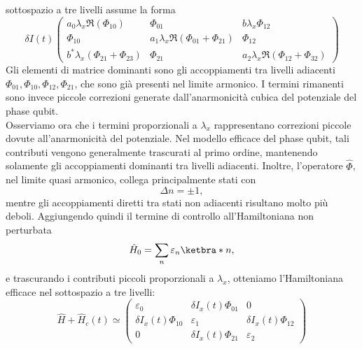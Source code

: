 sottospazio a tre livelli assume la forma
\begin{equation*}
    \delta I(t)
    \begin{pmatrix}
        a_0 \lambda_x \Re(\Phi_{10})
        &
        \Phi_{01}
        &
        b \lambda_x \Phi_{12}
        \\
        \Phi_{10}
        &
        a_1 \lambda_x \Re(\Phi_{01}+\Phi_{21})
        &
        \Phi_{12}
        \\
        b^{*}\lambda_x (\Phi_{21}+\Phi_{23})
        &
        \Phi_{21}
        &
        a_2 \lambda_x \Re(\Phi_{12}+\Phi_{32})
    \end{pmatrix}
\end{equation*}
Gli elementi di matrice dominanti sono gli accoppiamenti tra livelli
adiacenti $\Phi_{01}, \Phi_{10}, \Phi_{12}, \Phi_{21}$, che sono già presenti nel limite armonico. I termini rimanenti sono invece piccole correzioni generate dall'anarmonicità cubica del
potenziale del phase qubit.\\
Osserviamo ora che i termini proporzionali a $\lambda_x$ rappresentano correzioni piccole dovute all'anarmonicità del potenziale. Nel modello efficace del phase qubit, tali contributi vengono generalmente trascurati al primo ordine, mantenendo solamente gli accoppiamenti dominanti tra livelli adiacenti. Inoltre, l'operatore $\hat{\Phi}$, nel limite quasi armonico, collega principalmente stati con
\begin{equation*}
    \Delta n = \pm 1,
\end{equation*}
mentre gli accoppiamenti diretti tra stati non adiacenti risultano molto più deboli. Aggiungendo quindi il termine di controllo all'Hamiltoniana non perturbata
\begin{equation*}
    \hat{H}_0
    =
    \sum_n \varepsilon_n \ketbra*{n},
\end{equation*}
e trascurando i contributi piccoli proporzionali a $\lambda_x$, otteniamo
l'Hamiltoniana efficace nel sottospazio a tre livelli:
\begin{equation*}
    \hat{H} + \hat{H}_c(t)
    \simeq
    \begin{pmatrix}
        \varepsilon_0
        &
        \delta I_x(t)\Phi_{01}
        &
        0
        \\
        \delta I_x(t)\Phi_{10}
        &
        \varepsilon_1
        &
        \delta I_x(t)\Phi_{12}
        \\
        0
        &
        \delta I_x(t)\Phi_{21}
        &
        \varepsilon_2
    \end{pmatrix}
\end{equation*}
